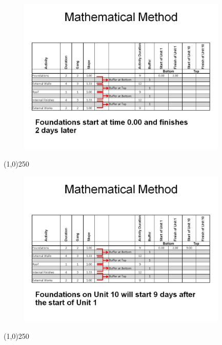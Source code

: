 \begin{frame}
\begin{figure}
	\centering
		\includegraphics[width = 10.0cm]{oldnotes/Slide282.jpg}
\end{figure}
\end{frame}
\begin{center}\line(1,0){250}\end{center}






\begin{frame}
\begin{figure}
	\centering
		\includegraphics[width = 10.0cm]{oldnotes/Slide283.jpg}
\end{figure}
\end{frame}
\begin{center}\line(1,0){250}\end{center}






